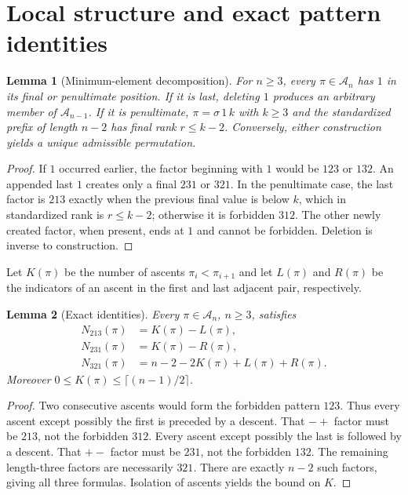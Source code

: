 \documentclass[11pt]{article}
\newtheorem{lemma}{Lemma}
\newcommand{\Av}{\mathcal{A}}
\begin{document}
\section{Local structure and exact pattern identities}
\begin{lemma}[Minimum-element decomposition]\label{l:min}
For $n\ge3$, every $\pi\in\Av_n$ has $1$ in its final or penultimate position. If it is last, deleting $1$ produces an arbitrary member of $\Av_{n-1}$. If it is penultimate, $\pi=\sigma\,1\,k$ with $k\ge3$ and the standardized prefix of length $n-2$ has final rank $r\le k-2$. Conversely, either construction yields a unique admissible permutation.
\end{lemma}
\begin{proof}
If $1$ occurred earlier, the factor beginning with $1$ would be $123$ or $132$. An appended last $1$ creates only a final $231$ or $321$. In the penultimate case, the last factor is $213$ exactly when the previous final value is below $k$, which in standardized rank is $r\le k-2$; otherwise it is forbidden $312$. The other newly created factor, when present, ends at $1$ and cannot be forbidden. Deletion is inverse to construction.
\end{proof}
Let $K(\pi)$ be the number of ascents $\pi_i<\pi_{i+1}$ and let $L(\pi)$ and $R(\pi)$ be the indicators of an ascent in the first and last adjacent pair, respectively.
\begin{lemma}[Exact identities]\label{l:patterns}
Every $\pi\in\Av_n$, $n\ge3$, satisfies
\begin{align*}
N_{213}(\pi)&=K(\pi)-L(\pi),\\
N_{231}(\pi)&=K(\pi)-R(\pi),\\
N_{321}(\pi)&=n-2-2K(\pi)+L(\pi)+R(\pi).
\end{align*}
Moreover $0\le K(\pi)\le\lceil(n-1)/2\rceil$.
\end{lemma}
\begin{proof}
Two consecutive ascents would form the forbidden pattern $123$. Thus every ascent except possibly the first is preceded by a descent. That $-+$ factor must be $213$, not the forbidden $312$. Every ascent except possibly the last is followed by a descent. That $+-$ factor must be $231$, not the forbidden $132$. The remaining length-three factors are necessarily $321$. There are exactly $n-2$ such factors, giving all three formulas. Isolation of ascents yields the bound on $K$.
\end{proof}
\end{document}
